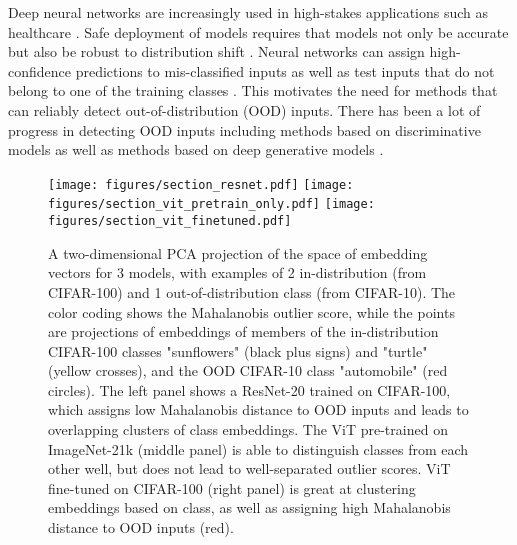 \documentclass{article}
\begin{document}
Deep neural networks are increasingly used in high-stakes applications such as healthcare \citep{roy2021does,ren2019likelihood}.  Safe deployment of models requires that models not only be accurate but also be robust to distribution shift \citep{amodei2016concrete}. Neural networks can assign high-confidence predictions to mis-classified inputs \citep{guo2017calibration,lakshminarayanan2017simple} as well as test inputs that do not belong  to one of the training classes \citep{nguyen2015deep}. This motivates the need for methods that can reliably detect out-of-distribution (OOD) inputs. 
There has been a lot of progress in detecting OOD inputs including methods based on discriminative models \citep{hendrycks2016baseline,lee2018simple,liang2017enhancing,liu2020simple} as well as methods based on deep generative models  \citep{nalisnick2019hybrid,zhang2020hybrid}. \begin{figure}[ht]
	\centering
	\texttt{[image: figures/section\_resnet.pdf]}
	\texttt{[image: figures/section\_vit\_pretrain\_only.pdf]}
	\texttt{[image: figures/section\_vit\_finetuned.pdf]}
	\caption{A two-dimensional PCA projection of the space of embedding vectors for 3 models, with examples of 2 in-distribution (from CIFAR-100) and 1 out-of-distribution class (from CIFAR-10). The color coding shows the Mahalanobis outlier score, while the points are projections of embeddings of members of the in-distribution CIFAR-100 classes "sunflowers" (black plus signs) and "turtle" (yellow crosses), and the OOD CIFAR-10 class "automobile" (red circles). The left panel shows a ResNet-20 trained on CIFAR-100, which assigns low Mahalanobis distance to OOD inputs and leads to overlapping clusters of class embeddings. The ViT pre-trained on ImageNet-21k (middle panel) is able to distinguish classes from each other well, but does not lead to well-separated outlier scores. ViT fine-tuned on CIFAR-100 (right panel) is great at clustering embeddings based on class, as well as assigning high Mahalanobis distance to OOD inputs (red).
	}
	\vspace{-1.5em}
	\label{fig:overview}
\end{figure}
\end{document}
